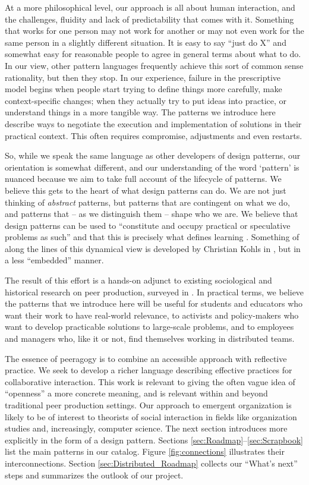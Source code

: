 At a more philosophical level, our approach is all about human interaction, and the challenges, fluidity and lack of predictability that comes with it.  Something that works for one person may not work for another or may not even work for the same person in a slightly different situation.  It is easy to say ``just do X'' and somewhat easy for reasonable people to agree in general terms about what to do.  In our view, other pattern languages frequently achieve this sort of common sense rationality, but then they stop.  In our experience, failure in the prescriptive model begins when people start trying to define things more carefully, make context-specific changes; when they actually try to put ideas into practice, or understand things in a more tangible way. The patterns we introduce here describe ways to negotiate the execution and implementation of solutions in their practical context.  This often requires compromise, adjustments and even restarts.  

So, while we speak the same language as other developers of design patterns, our orientation is somewhat different, and our understanding of the word `pattern' is nuanced because we aim to take full account of the lifecycle of patterns.  We believe this gets to the heart of what design patterns can do.  We are not just thinking of \emph{abstract} patterns, but patterns that are contingent on what we do, and patterns that -- as we distinguish them -- shape who we are.   We believe that design patterns can be used to ``constitute and occupy practical or speculative problems as such'' and that this is precisely what defines learning \cite[p. 204]{deleuze1994difference}.   Something of along the lines of this dynamical view
is developed by Christian Kohls in \cite{kohls2010structure,kohls2011structure}, but in a less ``embedded'' manner.

The result of this effort is a hands-on adjunct to existing sociological and historical research on peer production, surveyed in \cite{benkler2015peer}.  In practical terms, we believe the patterns that we introduce here will be useful for students and educators who want their work to have real-world relevance, to activists and policy-makers who want to develop practicable solutions to large-scale problems, and to employees and managers who, like it or not, find themselves working in distributed teams. 

The essence of peeragogy is to combine an accessible approach with reflective practice.   We seek to develop a richer language describing effective practices for collaborative interaction.  This work is relevant to giving the often vague idea of ``openness'' a more concrete meaning, and is relevant within and beyond traditional peer production settings.  Our approach to emergent organization is likely to be of interest to theorists of social interaction in fields like organization studies and, increasingly, computer science.  The next section introduces  more explicitly in the form of a design pattern.  Sections \ref{sec:Roadmap}--\ref{sec:Scrapbook} list the main patterns in our catalog.    Figure \ref{fig:connections} illustrates their interconnections.  Section \ref{sec:Distributed_Roadmap} collects our ``What's next'' steps and summarizes the outlook of our project.

